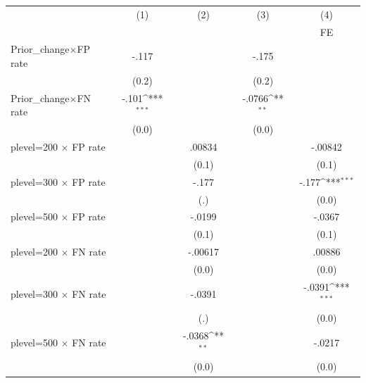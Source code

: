 {
\def\sym#1{\ifmmode^{#1}\else\(^{#1}\)\fi}
\begin{tabular}{l*{4}{c}}
\hline\hline
                &\multicolumn{1}{c}{(1)}&\multicolumn{1}{c}{(2)}&\multicolumn{1}{c}{(3)}&\multicolumn{1}{c}{(4)}\\
                &\multicolumn{1}{c}{}&\multicolumn{1}{c}{}&\multicolumn{1}{c}{}&\multicolumn{1}{c}{FE}\\
\hline
Prior\_change$\times$FP rate&    -.117         &                  &    -.175         &                  \\
                &    (0.2)         &                  &    (0.2)         &                  \\
Prior\_change$\times$FN rate&    -.101\sym{***}&                  &   -.0766\sym{**} &                  \\
                &    (0.0)         &                  &    (0.0)         &                  \\
plevel=200 $\times$ FP rate&                  &   .00834         &                  &  -.00842         \\
                &                  &    (0.1)         &                  &    (0.1)         \\
plevel=300 $\times$ FP rate&                  &    -.177         &                  &    -.177\sym{***}\\
                &                  &      (.)         &                  &    (0.0)         \\
plevel=500 $\times$ FP rate&                  &   -.0199         &                  &   -.0367         \\
                &                  &    (0.1)         &                  &    (0.1)         \\
plevel=200 $\times$ FN rate&                  &  -.00617         &                  &   .00886         \\
                &                  &    (0.0)         &                  &    (0.0)         \\
plevel=300 $\times$ FN rate&                  &   -.0391         &                  &   -.0391\sym{***}\\
                &                  &      (.)         &                  &    (0.0)         \\
plevel=500 $\times$ FN rate&                  &   -.0368\sym{**} &                  &   -.0217         \\
                &                  &    (0.0)         &                  &    (0.0)         \\

\end{tabular}}
